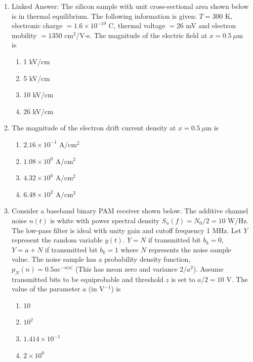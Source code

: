 \documentclass[journal,12pt,onecolumn]{IEEEtran}
\begin{document}
\begin{enumerate}
\item Linked Answer: The silicon sample with unit cross-sectional area shown below is in thermal equilibrium. The following information is given: $T=300$ K, electronic charge $=1.6\times 10^{-19}$ C, thermal voltage $=26$ mV and electron mobility $=1350$ cm$^2$/V-s. The magnitude of the electric field at $x=0.5\ \mu$m is
\begin{multicols}{2}
\begin{enumerate}
\item 1 kV/cm
\item 5 kV/cm
\item 10 kV/cm
\item 26 kV/cm
\end{enumerate}
\end{multicols}

\item The magnitude of the electron drift current density at $x=0.5\ \mu$m is
\begin{multicols}{2}
\begin{enumerate}
\item $2.16\times 10^{-1}$ A/cm$^2$
\item $1.08\times 10^{0}$ A/cm$^2$
\item $4.32\times 10^{0}$ A/cm$^2$
\item $6.48\times 10^{2}$ A/cm$^2$
\end{enumerate}
\end{multicols}

\item Consider a baseband binary PAM receiver shown below. The additive channel noise $n(t)$ is white with power spectral density $S_n(f)=N_0/2=10$ W/Hz. The low-pass filter is ideal with unity gain and cutoff frequency 1 MHz. Let $Y$ represent the random variable $y(t)$. $Y=N$ if transmitted bit $b_k=0$, $Y=a+N$ if transmitted bit $b_k=1$ where $N$ represents the noise sample value. The noise sample has a probability density function, $p_N(n)=0.5 a e^{-a|n|}$ (This has mean zero and variance $2/a^2$). Assume transmitted bits to be equiprobable and threshold $z$ is set to $a/2=10$ V. The value of the parameter $a$ (in V$^{-1}$) is
\begin{multicols}{2}
\begin{enumerate}
\item 10
\item $10^2$
\item $1.414\times 10^{-1}$
\item $2\times 10^0$
\end{enumerate}
\end{multicols}


\end{enumerate}
\end{document}
